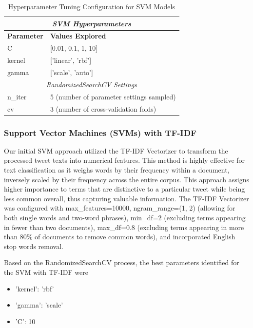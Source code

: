 \begin{table}[H]
\centering
\caption{Hyperparameter Tuning Configuration for SVM Models}
\begin{tabular}{|l|l|}
\hline
\multicolumn{2}{|c|}{\textit{SVM Hyperparameters}} \\
\hline
\textbf{Parameter} & \textbf{Values Explored} \\
\hline
C & [0.01, 0.1, 1, 10] \\
kernel & ['linear', 'rbf'] \\
gamma & ['scale', 'auto'] \\
\hline\hline 
\multicolumn{2}{|c|}{\textit{RandomizedSearchCV Settings}} \\
\hline
n\_iter & 5 (number of parameter settings sampled) \\
cv & 3 (number of cross-validation folds) \\
\hline
\end{tabular}
\label{tab:svm_tuning_params}
\end{table}



\subsubsection{\textbf{Support Vector Machines (SVMs) with TF-IDF}}

Our initial SVM approach utilized the TF-IDF Vectorizer to transform the processed tweet texts into numerical features. This method is highly effective for text classification as it weighs words by their frequency within a document, inversely scaled by their frequency across the entire corpus. This approach assigns higher importance to terms that are distinctive to a particular tweet while being less common overall, thus capturing valuable information. The TF-IDF Vectorizer was configured with max\_features=10000, ngram\_range=(1, 2) (allowing for both single words and two-word phrases), min\_df=2 (excluding terms appearing in fewer than two documents), max\_df=0.8 (excluding terms appearing in more than 80\% of documents to remove common words), and incorporated English stop words removal.

Based on the RandomizedSearchCV process, the best parameters identified for the SVM with TF-IDF were 
\begin{itemize}
    \item 'kernel': 'rbf'
    \item 'gamma': 'scale'
    \item 'C': 10
\end{itemize}

